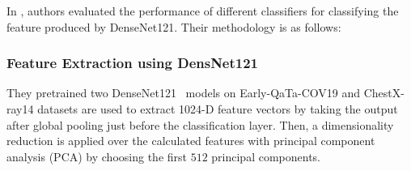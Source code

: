 
In \cite{ar}, authors evaluated the performance of different classifiers for classifying the feature produced by DenseNet121. Their methodology is as follows:
\subsubsection{Feature Extraction using DensNet121}
They pretrained two DenseNet121~\cite{huang2017densely} models on Early-QaTa-COV19 and ChestX-ray14 datasets are used to extract 1024-D feature vectors by taking the output after global pooling just before the classification layer. Then, a dimensionality reduction is applied over the calculated features with principal component analysis (PCA) by choosing the first $512$ principal components.

